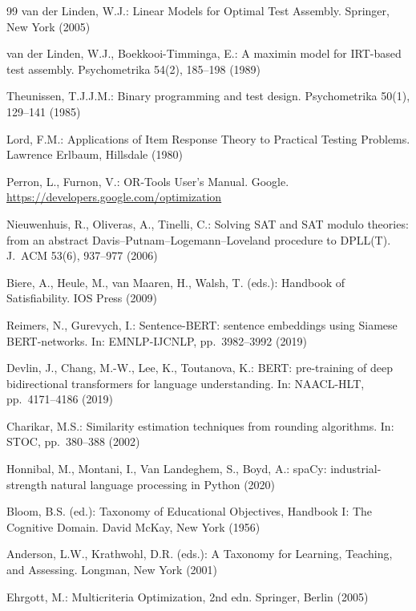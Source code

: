 \documentclass[runningheads]{llncs}
\begin{document}
\begin{thebibliography}{99}
van der Linden, W.J.: Linear Models for Optimal Test Assembly.
Springer, New York (2005)

van der Linden, W.J., Boekkooi-Timminga, E.: A maximin model for IRT-based test assembly.
Psychometrika 54(2), 185--198 (1989)

Theunissen, T.J.J.M.: Binary programming and test design.
Psychometrika 50(1), 129--141 (1985)

Lord, F.M.: Applications of Item Response Theory to Practical Testing Problems.
Lawrence Erlbaum, Hillsdale (1980)

Perron, L., Furnon, V.: OR-Tools User's Manual. Google.
\url{https://developers.google.com/optimization}

Nieuwenhuis, R., Oliveras, A., Tinelli, C.: Solving SAT and SAT modulo theories: from an abstract Davis--Putnam--Logemann--Loveland procedure to DPLL(T).
J.\ ACM 53(6), 937--977 (2006)

Biere, A., Heule, M., van Maaren, H., Walsh, T. (eds.): Handbook of Satisfiability.
IOS Press (2009)

Reimers, N., Gurevych, I.: Sentence-BERT: sentence embeddings using Siamese BERT-networks.
In: EMNLP-IJCNLP, pp.\ 3982--3992 (2019)

Devlin, J., Chang, M.-W., Lee, K., Toutanova, K.: BERT: pre-training of deep bidirectional transformers for language understanding.
In: NAACL-HLT, pp.\ 4171--4186 (2019)

Charikar, M.S.: Similarity estimation techniques from rounding algorithms.
In: STOC, pp.\ 380--388 (2002)

Honnibal, M., Montani, I., Van Landeghem, S., Boyd, A.: spaCy: industrial-strength natural language processing in Python (2020)

Bloom, B.S. (ed.): Taxonomy of Educational Objectives, Handbook I: The Cognitive Domain. David McKay, New York (1956)

Anderson, L.W., Krathwohl, D.R. (eds.): A Taxonomy for Learning, Teaching, and Assessing. Longman, New York (2001)

Ehrgott, M.: Multicriteria Optimization, 2nd edn.
Springer, Berlin (2005)


\end{thebibliography}
\end{document}
